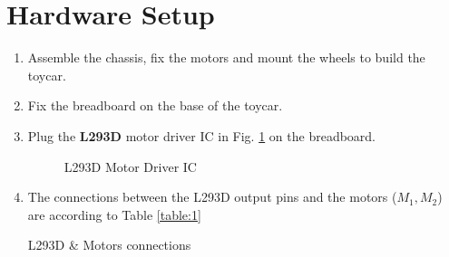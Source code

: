 \documentclass[conference]{IEEEtran}
\begin{document}
\section{Hardware Setup}
%
\begin{enumerate}[label=\thesection.\arabic*,ref=\thesection.\theenumi]

\item Assemble the chassis, fix the motors and mount the wheels to build the toycar.

\item Fix the breadboard on the base of the toycar.

\item Plug the \textbf{L293D} motor driver IC in Fig. \ref{fig:l293d_ic} on the breadboard.

\begin{figure}[!ht]
\centering
{}%
\caption{L293D Motor Driver IC}
\label{fig:l293d_ic}
\end{figure}

\item The connections between the L293D output pins and the motors ($M_1, M_2$) are according to Table \ref{table:1}
\begin{table}[h!]
  \centering
  
  \caption{L293D \& Motors connections}
  \label{table:1}
\end{table}


\end{enumerate}
\end{document}
